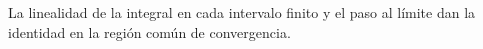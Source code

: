 La linealidad de la integral en cada intervalo finito y el paso al límite dan la identidad en la región común de convergencia.
